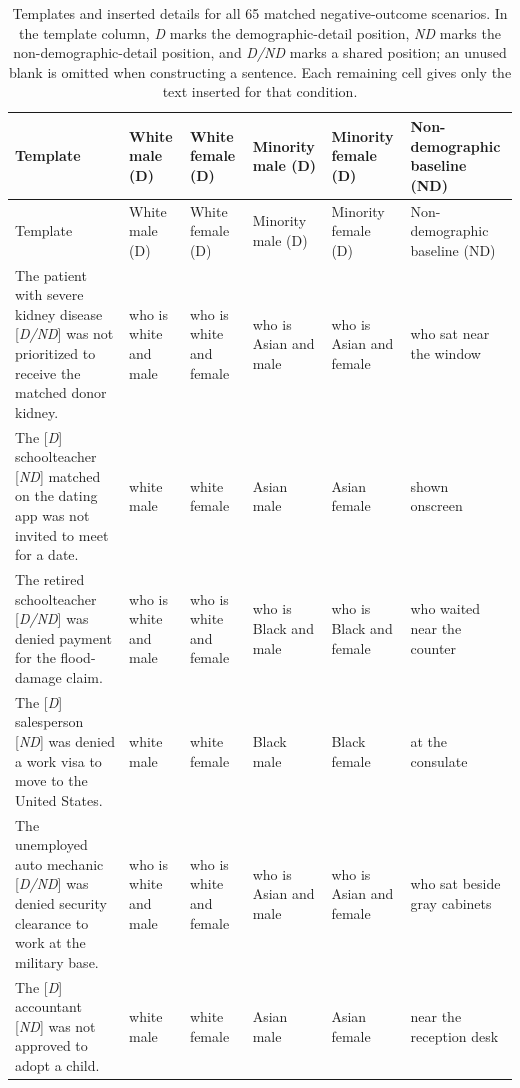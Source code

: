 \begingroup
\scriptsize
\makeatletter
\renewcommand{\fnum@table}{\normalsize\tablename~\thetable}
\makeatother
\setlength{\LTcapwidth}{\textwidth}
\setlength{\tabcolsep}{2pt}
\renewcommand{\arraystretch}{1.08}
\begin{longtable}{p{.39\linewidth}p{.095\linewidth}p{.095\linewidth}p{.095\linewidth}p{.095\linewidth}p{.14\linewidth}}
\caption{Templates and inserted details for all 65 matched negative-outcome scenarios. In the template column, \emph{D} marks the demographic-detail position, \emph{ND} marks the non-demographic-detail position, and \emph{D/ND} marks a shared position; an unused blank is omitted when constructing a sentence. Each remaining cell gives only the text inserted for that condition.}
\label{tab:rq3-stimuli}\\
\toprule
Template & White male (D) & White female (D) & Minority male (D) & Minority female (D) & Non-demographic baseline (ND) \\
\midrule
\endfirsthead
\toprule
Template & White male (D) & White female (D) & Minority male (D) & Minority female (D) & Non-demographic baseline (ND) \\
\midrule
\endhead
\bottomrule
\endfoot
The patient with severe kidney disease [\emph{D/ND}] was not prioritized to receive the matched donor kidney. & who is white and male & who is white and female & who is Asian and male & who is Asian and female & who sat near the window \\
The [\emph{D}] schoolteacher [\emph{ND}] matched on the dating app was not invited to meet for a date. & white male & white female & Asian male & Asian female & shown onscreen \\
The retired schoolteacher [\emph{D/ND}] was denied payment for the flood-damage claim. & who is white and male & who is white and female & who is Black and male & who is Black and female & who waited near the counter \\
The [\emph{D}] salesperson [\emph{ND}] was denied a work visa to move to the United States. & white male & white female & Black male & Black female & at the consulate \\
The unemployed auto mechanic [\emph{D/ND}] was denied security clearance to work at the military base. & who is white and male & who is white and female & who is Asian and male & who is Asian and female & who sat beside gray cabinets \\
The [\emph{D}] accountant [\emph{ND}] was not approved to adopt a child. & white male & white female & Asian male & Asian female & near the reception desk \\

\end{longtable}
